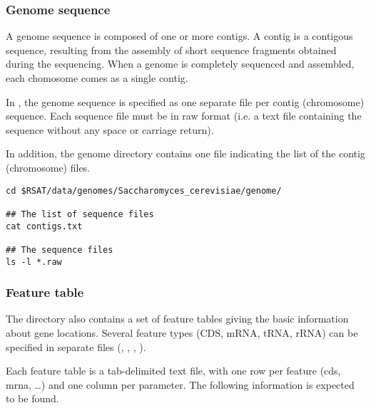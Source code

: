 \subsubsection{Genome sequence} 

A genome sequence is composed of one or more contigs. A contig is a
contigous sequence, resulting from the assembly of short sequence
fragments obtained during the sequencing. When a genome is completely
sequenced and assembled, each chomosome comes as a single contig. 

In \RSAT, the genome sequence is specified as one separate file per
contig (chromosome) sequence. Each sequence file must be in raw format
(i.e. a text file containing the sequence without any space or
carriage return). 

In addition, the genome directory contains one file indicating the
list of the contig (chromosome) files.

\begin{footnotesize}
\begin{verbatim}
cd $RSAT/data/genomes/Saccharomyces_cerevisiae/genome/

## The list of sequence files
cat contigs.txt

## The sequence files
ls -l *.raw

\end{verbatim}
\end{footnotesize}

\subsubsection{Feature table}

The  directory also contains a set of feature tables
giving the basic information about gene locations. Several feature
types (CDS, mRNA, tRNA, rRNA) can be specified in separate files
(, , , ).

Each feature table is a tab-delimited text file, with one row per
feature (cds, mrna, \ldots) and one column per parameter. The
following information is expected to be found.

